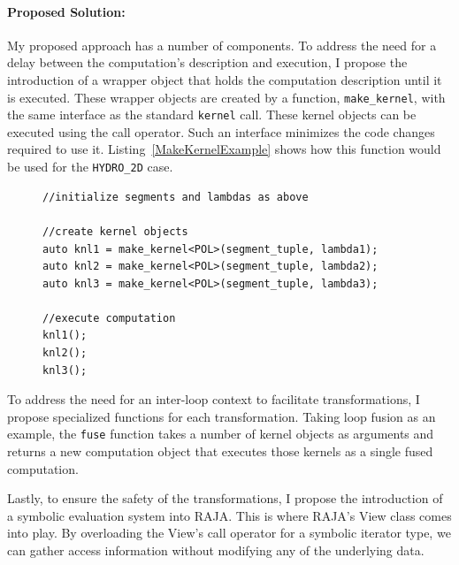 \documentclass{article}
\begin{document}
\paragraph{Proposed Solution:}

My proposed approach has a number of components.
To address the need for a delay between the computation's description and execution, I propose the introduction of a wrapper object that holds the computation description until it is executed.
These wrapper objects are created by a function, \verb.make_kernel., with the same interface as the standard \verb.kernel. call. 
These kernel objects can be executed using the call operator.
Such an interface minimizes the code changes required to use it.
Listing~\ref{MakeKernelExample} shows how this function would be used for the \verb.HYDRO_2D. case.

\begin{figure}
    \begin{lstlisting}[caption={Example usage of the \texttt{make\_kernel} function.},label={MakeKernelExample}]
//initialize segments and lambdas as above

//create kernel objects
auto knl1 = make_kernel<POL>(segment_tuple, lambda1);
auto knl2 = make_kernel<POL>(segment_tuple, lambda2);
auto knl3 = make_kernel<POL>(segment_tuple, lambda3);

//execute computation
knl1();
knl2();
knl3();
    \end{lstlisting}
\end{figure}

To address the need for an inter-loop context to facilitate transformations, I propose specialized functions for each transformation. 
Taking loop fusion as an example, the \verb.fuse. function takes a number of kernel objects as arguments and returns a new computation object that executes those kernels as a single fused computation. 

Lastly, to ensure the safety of the transformations, I propose the introduction of a symbolic evaluation system into RAJA.
This is where RAJA's View class comes into play. 
By overloading the View's call operator for a symbolic iterator type, we can gather access information without modifying any of the underlying data. 

\end{document}
